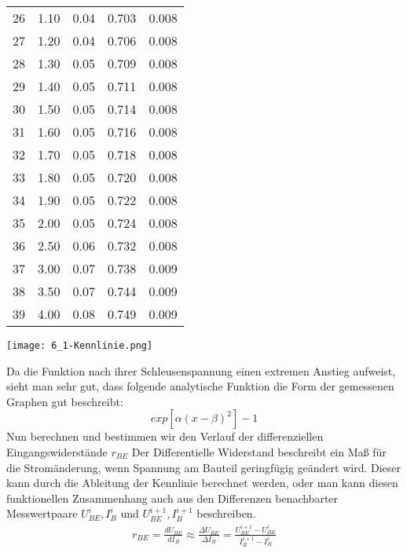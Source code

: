 \begin{center}
\begin{tabular}{l|cccc}
        26 &  1.10 &     0.04 &  0.703 &     0.008 \\
        27 &  1.20 &     0.04 &  0.706 &     0.008 \\
        28 &  1.30 &     0.05 &  0.709 &     0.008 \\
        29 &  1.40 &     0.05 &  0.711 &     0.008 \\
        30 &  1.50 &     0.05 &  0.714 &     0.008 \\
        31 &  1.60 &     0.05 &  0.716 &     0.008 \\
        32 &  1.70 &     0.05 &  0.718 &     0.008 \\
        33 &  1.80 &     0.05 &  0.720 &     0.008 \\
        34 &  1.90 &     0.05 &  0.722 &     0.008 \\
        35 &  2.00 &     0.05 &  0.724 &     0.008 \\
        36 &  2.50 &     0.06 &  0.732 &     0.008 \\
        37 &  3.00 &     0.07 &  0.738 &     0.009 \\
        38 &  3.50 &     0.07 &  0.744 &     0.009 \\
        39 &  4.00 &     0.08 &  0.749 &     0.009 \\
    \end{tabular}
\end{center}
\begin{center}
    \texttt{[image: 6\_1-Kennlinie.png]}
\end{center}
Da die Funktion nach ihrer Schleusenspannung einen extremen Anstieg aufweist, sieht man sehr gut, dass folgende analytische Funktion die Form der gemessenen Graphen gut beschreibt: 
\begin{equation}
    exp[\alpha(x-\beta)^2]-1
\end{equation}
Nun berechnen und bestimmen wir den Verlauf der differenziellen Eingangswiderst\"ande $r_{BE}$
Der Differentielle Widerstand beschreibt ein Maß für die Stromänderung, wenn Spannung am Bauteil geringfügig geändert wird. Dieser kann durch die Ableitung der Kennlinie berechnet werden, oder man kann diesen funktionellen Zusammenhang auch aus den Differenzen benachbarter Messwertpaare $U_{BE}^i, I_B^i$ und $U_{BE}^{i+1},  I_B^{i+1}$ beschreiben.
\begin{align}
    r_{BE}=\frac{dU_{BE}}{dI_B}\approx\frac{\Delta U_{BE}}{\Delta I_B}=\frac{U_{BE}^{i+1}-U_{BE}^i}{I_B^{i+1}-I_B^i}
\end{align}
